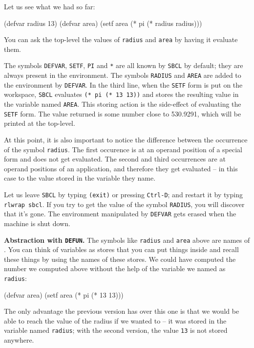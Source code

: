 \documentclass[a4paper,11pt]{article}
\begin{document}
\begin{uenum}
\item Let us see what we had so far:

\begin{lispcode}
(defvar radius 13)
(defvar area)
(setf area (* pi (* radius radius)))
\end{lispcode}

You can ask the top-level the values of \Verb+radius+ and \Verb+area+ by having it evaluate them.

The symbols \Verb+DEFVAR+, \Verb+SETF+, \Verb+PI+ and \Verb+*+ are all known by \Verb+SBCL+ by default; they are always present in the environment. The symbols \Verb+RADIUS+ and \Verb+AREA+ are added to the environment by \Verb+DEFVAR+. In the third line, when the \Verb+SETF+ form is put on the workspace, \Verb+SBCL+ evaluates \Verb+(* pi (* 13 13))+ and stores the resulting value in the variable named \Verb+AREA+. This storing action is the side-effect of evaluating the \Verb+SETF+ form. The value returned is some number close to 530.9291, which will be printed at the top-level.

At this point, it is also important to notice the difference between the occurrence of the symbol \Verb+radius+. The first occurence is at an operand position of a special form and does not get evaluated. The second and third occurrences are at operand positions of an application, and therefore they get evaluated -- in this case to the value stored in the variable they name.

Let us leave \Verb+SBCL+ by typing \Verb+(exit)+ or pressing \Verb+Ctrl-D+; and restart it by typing \Verb+rlwrap sbcl+. If you try to get the value of the symbol \Verb+RADIUS+, you will discover that it's gone. The environment manipulated by \Verb+DEFVAR+ gets erased when the machine is shut down. 


\item {\bf Abstraction with \Verb+DEFUN+.} The symbols like \Verb+radius+ and \Verb+area+ above are names of . You can think of variables as stores that you can put things inside and recall these things by using the names of these stores. We could have computed the number we computed above without the help of the variable we named as \Verb+radius+:

\begin{lispcode}
(defvar area)
(setf area (* pi (* 13 13)))
\end{lispcode}

The only advantage the previous version has over this one is that we would be able to reach the value of the radius if we wanted to -- it was stored in the variable named \Verb+radius+; with the second version, the value \Verb+13+ is not stored anywhere. 


\end{uenum}
\end{document}
